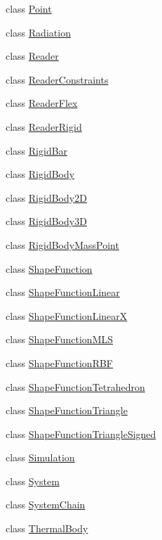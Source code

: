 \begin{DoxyCompactItemize}
class \hyperlink{classmknix_1_1_point}{Point}
\item 
class \hyperlink{classmknix_1_1_radiation}{Radiation}
\item 
class \hyperlink{classmknix_1_1_reader}{Reader}
\item 
class \hyperlink{classmknix_1_1_reader_constraints}{Reader\+Constraints}
\item 
class \hyperlink{classmknix_1_1_reader_flex}{Reader\+Flex}
\item 
class \hyperlink{classmknix_1_1_reader_rigid}{Reader\+Rigid}
\item 
class \hyperlink{classmknix_1_1_rigid_bar}{Rigid\+Bar}
\item 
class \hyperlink{classmknix_1_1_rigid_body}{Rigid\+Body}
\item 
class \hyperlink{classmknix_1_1_rigid_body2_d}{Rigid\+Body2\+D}
\item 
class \hyperlink{classmknix_1_1_rigid_body3_d}{Rigid\+Body3\+D}
\item 
class \hyperlink{classmknix_1_1_rigid_body_mass_point}{Rigid\+Body\+Mass\+Point}
\item 
class \hyperlink{classmknix_1_1_shape_function}{Shape\+Function}
\item 
class \hyperlink{classmknix_1_1_shape_function_linear}{Shape\+Function\+Linear}
\item 
class \hyperlink{classmknix_1_1_shape_function_linear_x}{Shape\+Function\+Linear\+X}
\item 
class \hyperlink{classmknix_1_1_shape_function_m_l_s}{Shape\+Function\+M\+L\+S}
\item 
class \hyperlink{classmknix_1_1_shape_function_r_b_f}{Shape\+Function\+R\+B\+F}
\item 
class \hyperlink{classmknix_1_1_shape_function_tetrahedron}{Shape\+Function\+Tetrahedron}
\item 
class \hyperlink{classmknix_1_1_shape_function_triangle}{Shape\+Function\+Triangle}
\item 
class \hyperlink{classmknix_1_1_shape_function_triangle_signed}{Shape\+Function\+Triangle\+Signed}
\item 
class \hyperlink{classmknix_1_1_simulation}{Simulation}
\item 
class \hyperlink{classmknix_1_1_system}{System}
\item 
class \hyperlink{classmknix_1_1_system_chain}{System\+Chain}
\item 
class \hyperlink{classmknix_1_1_thermal_body}{Thermal\+Body}
\end{DoxyCompactItemize}
